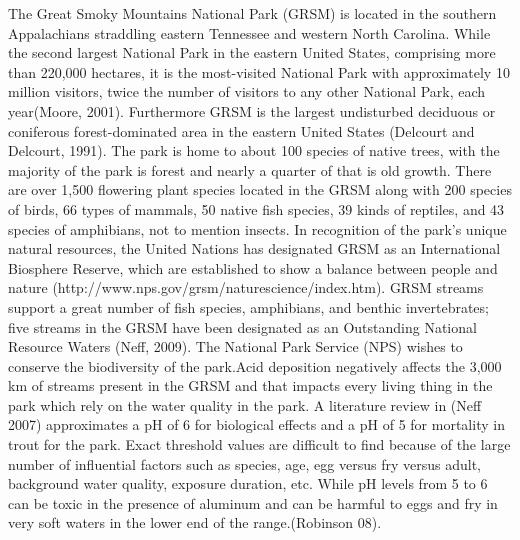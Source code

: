 The Great Smoky Mountains National Park (GRSM) is located in the southern Appalachians straddling eastern Tennessee and western North Carolina.  While the second largest National Park in the eastern United States, comprising more than 220,000 hectares, it is the most-visited National Park with approximately 10 million visitors, twice the number of visitors to any other National Park, each year(Moore, 2001).  Furthermore GRSM is the largest undisturbed deciduous or coniferous forest-dominated area in the eastern United States (Delcourt and Delcourt, 1991).  The park is home to about 100 species of native trees, with the majority of the park is forest and nearly a quarter of that is old growth.  There are over 1,500 flowering plant species located in the GRSM along with 200 species of birds, 66 types of mammals, 50 native fish species, 39 kinds of reptiles, and 43 species of amphibians,  not to mention insects.  In recognition of the park's unique natural resources, the United Nations has designated GRSM as an International Biosphere Reserve, which are established to show a balance between people and nature (http://www.nps.gov/grsm/naturescience/index.htm). GRSM streams support a great number of fish species, amphibians, and benthic invertebrates; five streams in the GRSM have been designated as an Outstanding National Resource Waters (Neff, 2009).  The National Park Service (NPS) wishes to conserve the biodiversity of the park.Acid deposition negatively affects the 3,000 km of streams present in the GRSM and that impacts every living thing in the park which rely on the water quality in the park.  A literature review in (Neff 2007) approximates a pH of 6 for biological effects and a pH of 5 for mortality in trout for the park.  Exact threshold values are difficult to find because of the large number of influential factors such as species, age, egg versus fry versus adult, background water quality, exposure duration, etc.  While pH levels from 5 to 6 can be toxic in the presence of aluminum and can be harmful to eggs and fry in very soft waters in the lower end of the range.(Robinson 08).  
